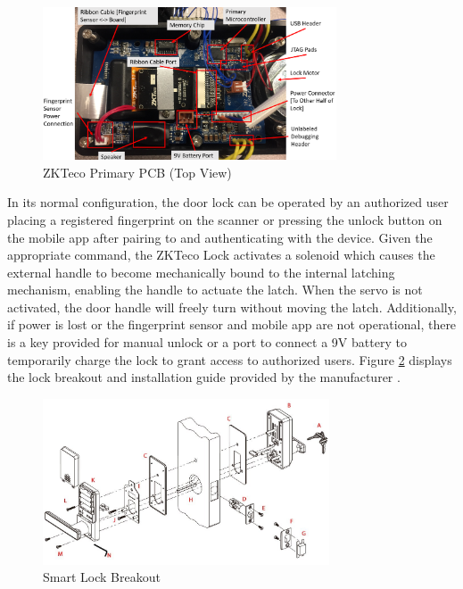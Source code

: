 \documentclass[conference]{IEEEtran}
\begin{document}
\begin{figure}[ht]
  \includegraphics[width=8.7cm]{images/MainPCB(Labeled).png}
  \caption{ZKTeco Primary PCB (Top View)}
  \label{fig:pcb1}
\end{figure}

\bigskip 

In its normal configuration, the door lock can be operated by an authorized user placing a registered fingerprint on the scanner or pressing the unlock button on the mobile app after pairing to and authenticating with the device. Given the appropriate command, the ZKTeco Lock activates a solenoid which causes the external handle to become mechanically bound to the internal latching mechanism, enabling the handle to actuate the latch. When the servo is not activated, the door handle will freely turn without moving the latch. Additionally, if power is lost or the fingerprint sensor and mobile app are not operational, there is a key provided for manual unlock or a port to connect a 9V battery to temporarily charge the lock to grant access to authorized users. Figure \ref{fig:lock} displays the lock breakout and installation guide provided by the manufacturer \cite{ZKTeco}.

\begin{figure}[ht]
  \includegraphics[width=8.5cm]{Lock.png}
  \caption{Smart Lock Breakout}
  \label{fig:lock}
\end{figure}

\bigskip 
\end{document}
